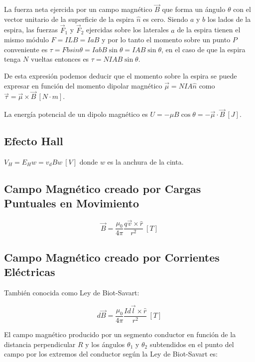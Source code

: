 \documentclass{tufte-handout}
\begin{document}
La fuerza neta ejercida por un campo magnético $\vec{B}$ que forma un ángulo $\theta$ con el vector unitario de la superficie de la espira $\hat{n}$ es cero. Siendo $a$ y $b$ los lados de la espira, las fuerzas $\vec{F}_1$ y $\vec{F}_2$ ejercidas sobre los laterales $a$ de la espira tienen el mismo módulo $F = ILB = IaB$ y por lo tanto el momento sobre un punto $P$ conveniente es $\tau = Fbsin\theta = IabB\sin{\theta} = IAB\sin{\theta}$, en el caso de que la espira tenga $N$ vueltas entonces es $\tau = NIAB\sin{\theta}$.

De esta expresión podemos deducir que el momento sobre la espira se puede expresar en función del momento dipolar magnético $\vec{\mu} = NIA\hat{n}$ como $\vec{\tau} = \vec{\mu}\times\vec{B}~[N\cdot m]$.

La energía potencial de un dipolo magnético es $U = -\mu B\cos{\theta} = -\vec{\mu}\cdot\vec{B}~[J]$.

\subsection{Efecto Hall}

$V_H = E_Hw = v_dBw~[V]$ donde $w$ es la anchura de la cinta.

\subsection{Campo Magnético creado por Cargas Puntuales en Movimiento}

\begin{equation}
\vec{B} = \frac{\mu_0}{4\pi}\frac{q\vec{v}\times\hat{r}}{r^2}~[T]
\end{equation}

\subsection{Campo Magnético creado por Corrientes Eléctricas}

También conocida como Ley de Biot-Savart:

\begin{equation}
d\vec{B} = \frac{\mu_0}{4\pi}\frac{Id\vec{l}\times\hat{r}}{r^2}~[T]
\end{equation}

El campo magnético producido por un segmento conductor en función de la distancia perpendicular $R$ y los ángulos $\theta_1$ y $\theta_2$ subtendidos en el punto del campo por los extremos del conductor según la Ley de Biot-Savart es:
\end{document}

